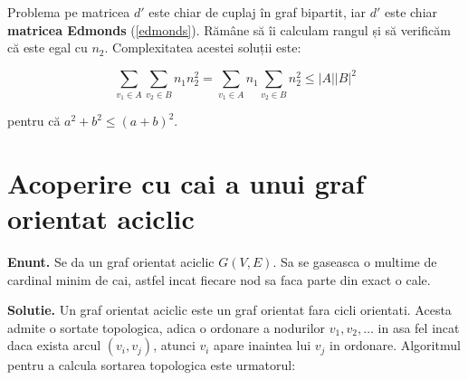 Problema pe matricea $d'$ este chiar de cuplaj în graf bipartit, iar $d'$ este chiar \textbf{matricea Edmonds} (\ref{edmonds}). Rămâne să îi calculam
rangul și să verificăm că este egal cu $n_{2}$. Complexitatea acestei soluții este:

\begin{equation}
  \displaystyle\sum\limits_{v_{1} \in A} \displaystyle\sum\limits_{v_{2} \in B} n_{1}n_{2}^{2} = \displaystyle\sum\limits_{v_{1} \in A} n_{1} \displaystyle\sum\limits_{v_{2} \in B} n_{2}^{2} \leq |A||B|^{2}
\end{equation}

\noindent pentru că $a^{2} + b^{2} \leq (a + b)^{2}$.

\pagebreak

\section{Acoperire cu cai a unui graf orientat aciclic}

\noindent \textbf{Enunt.} Se da un graf orientat aciclic $G(V, E)$. Sa se gaseasca o multime de cardinal minim de cai, astfel incat
fiecare nod sa faca parte din exact o cale.

\noindent \textbf{Solutie.} Un graf orientat aciclic este un graf orientat fara cicli orientati. Acesta admite o sortate topologica,
adica o ordonare a nodurilor $v_{1}, v_{2}, \ldots$ in asa fel incat daca exista arcul $(v_{i}, v_{j})$, atunci $v_{i}$ apare inaintea
lui $v_{j}$ in ordonare. Algoritmul pentru a calcula sortarea topologica este urmatorul:

\begin{algorithm}[H]
  \DontPrintSemicolon
  \;
\end{algorithm}

\begin{algorithm}[H]
  \DontPrintSemicolon
  \;
\end{algorithm}

\pagebreak

